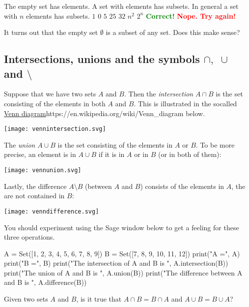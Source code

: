 \documentclass{article}
\newcommand{\red}[1]{\textcolor{red}{\textbf{#1}}}
\newcommand{\green}[1]{\textcolor{green}{\textbf{#1}}}
\begin{document}
\begin{quizexercise}[showhide]
\begin{paraquiz}
  \question
  The empty set has \box elements. A set with \box elements has \box subsets. In general a set with
  $n$ elements has \box subsets.
  \answer
  $1$
  \answer
  $0$
  \answer
  $5$
  \answer
  $25$
  \answer
  $32$
  \answer
  $n^2$
  \answer
  $2^n$
  \green{Correct!}
  \red{Nope. Try again!}
\end{paraquiz}
\end{quizexercise}


It turns out that the empty set $\emptyset$ is a subset of any set. Does this
make sense?

\subsection{Intersections, unions and the symbols $\cap,\,\, \cup$ and $\setminus$}

Suppose that we have two sets $A$ and $B$. Then the \emph{intersection} $A\cap B$ is the
set consisting of the elements in both $A$ and $B$. This is illustrated in the
socalled \url{Venn diagram}{https://en.wikipedia.org/wiki/Venn_diagram} below.

\texttt{[image: vennintersection.svg]}

The \emph{union} $A\cup B$ is the
set consisting of the elements in $A$ or $B$. To be more precise, an element is in
$A\cup B$ if it is in $A$ or in $B$ (or in both of them):

\texttt{[image: vennunion.svg]}

Lastly, the
difference $A\setminus B$ (between $A$ and $B$) consists of the elements
in $A$, the are not contained in $B$:

\texttt{[image: venndifference.svg]}

You should experiment using the Sage window below to get a feeling for these three operations.

\begin{sage}
A = Set([1, 2, 3, 4, 5, 6, 7, 8, 9])
B = Set([7, 8, 9, 10, 11, 12])
print("A =", A)
print("B =", B)
print("The intersection of A and B is ", A.intersection(B))
print("The union of A and B is ", A.union(B))
print("The difference between A and B is ", A.difference(B))
\end{sage}

\beginshex
Given two sets $A$ and $B$, is it true that
$A \cap B = B \cap A$ and $A\cup B = B\cup A$?
\end{document}
